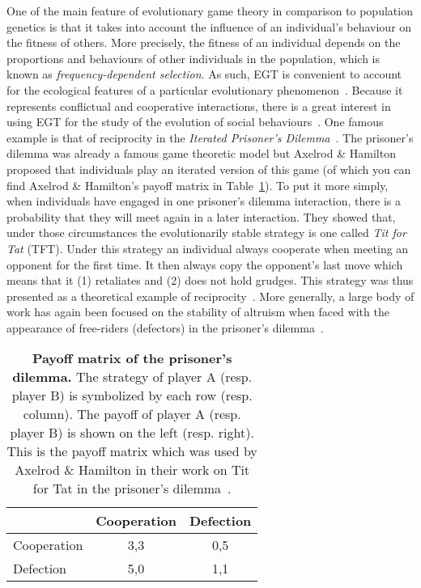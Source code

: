             One of the main feature of evolutionary game theory in comparison to population genetics is that it takes into account the influence of an individual's behaviour on the fitness of others. More precisely, the fitness of an individual depends on the proportions and behaviours of other individuals in the population, which is known as \emph{frequency-dependent selection}. As such, EGT is convenient to account for the ecological features of a particular evolutionary phenomenon~\parencite{Hammerstein1994}. Because it represents conflictual and cooperative interactions, there is a great interest in using EGT for the study of the evolution of social behaviours~\parencite{Bshary2015}. One famous example is that of reciprocity in the \emph{Iterated Prisoner's Dilemma}~\parencite{Axelrod1984}. The prisoner's dilemma was already a famous game theoretic model but Axelrod \& Hamilton proposed that individuals play an iterated version of this game (of which you can find Axelrod \& Hamilton's payoff matrix in Table~\ref{table:payoffIPD}). To put it more simply, when individuals have engaged in one prisoner's dilemma interaction, there is a probability that they will meet again in a later interaction. They showed that, under those circumstances the evolutionarily stable strategy is one called \emph{Tit for Tat} (TFT). Under this strategy an individual always cooperate when meeting an opponent for the first time. It then always copy the opponent's last move which means that it (1) retaliates and (2) does not hold grudges. This strategy was thus presented as a theoretical example of reciprocity~\parencite{Trivers1971}. More generally, a large body of work has again been focused on the stability of altruism when faced with the appearance of free-riders (defectors) in the prisoner's dilemma~\parencite{Requejo2013a}.


            \begin{table}[ht]
            \centering
              \begin{tabular}{l|c|c}
                & Cooperation & Defection \\
                \hline
                Cooperation & 3,3 & 0,5 \\
                \hline
                Defection & 5,0 & 1,1 \\
                \hline
              \end{tabular}
              \caption{\textbf{Payoff matrix of the prisoner's dilemma.}
              The strategy of player A (resp. player B) is symbolized by each row (resp. column). The payoff of player A (resp. player B) is shown on the left (resp. right). This is the payoff matrix which was used by Axelrod \& Hamilton in their work on Tit for Tat in the prisoner's dilemma~\parencite{Axelrod1984}.}
            \label{table:payoffIPD}
            \end{table}


